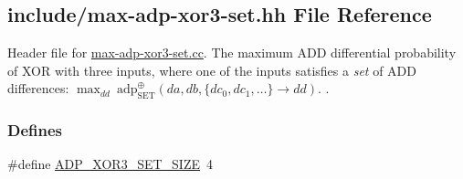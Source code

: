 \hypertarget{max-adp-xor3-set_8hh}{\subsection{include/max-\/adp-\/xor3-\/set.hh \-File \-Reference}
\label{max-adp-xor3-set_8hh}
}


\-Header file for \hyperlink{max-adp-xor3-set_8cc}{max-\/adp-\/xor3-\/set.\-cc}. \-The maximum \-A\-D\-D differential probability of \-X\-O\-R with three inputs, where one of the inputs satisfies a {\itshape set\/} of \-A\-D\-D differences\-: $\max_{dd}~\mathrm{adp}^{\oplus}_{\mathrm{SET}}(da, db, \{{dc}_0, {dc}_1, \ldots\} \rightarrow dd)$. .  


\subsubsection*{\-Defines}
\begin{DoxyCompactItemize}
\item 
\#define \hyperlink{max-adp-xor3-set_8hh_a6b52658f2068b1daef8ed31dd70ead0c}{\-A\-D\-P\-\_\-\-X\-O\-R3\-\_\-\-S\-E\-T\-\_\-\-S\-I\-Z\-E}~4
\end{DoxyCompactItemize}
